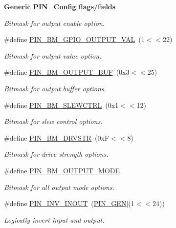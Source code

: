 \begin{Indent}{\bf Generic P\-I\-N\-\_\-\-Config flags/fields}
\begin{DoxyCompactItemize}
\begin{DoxyCompactList}\small\item\em Bitmask for output enable option. \end{DoxyCompactList}\item 
\#define \hyperlink{_p_i_n_8h_a40f78467926deed6685f0beb39594be8}{P\-I\-N\-\_\-\-B\-M\-\_\-\-G\-P\-I\-O\-\_\-\-O\-U\-T\-P\-U\-T\-\_\-\-V\-A\-L}~(1$<$$<$22)
\begin{DoxyCompactList}\small\item\em Bitmask for output value option. \end{DoxyCompactList}\item 
\#define \hyperlink{_p_i_n_8h_ae8cadb31765041c9025447cf9538e687}{P\-I\-N\-\_\-\-B\-M\-\_\-\-O\-U\-T\-P\-U\-T\-\_\-\-B\-U\-F}~(0x3$<$$<$25)
\begin{DoxyCompactList}\small\item\em Bitmask for output buffer options. \end{DoxyCompactList}\item 
\#define \hyperlink{_p_i_n_8h_ab564685f4cfb90c924db8d7993612c4b}{P\-I\-N\-\_\-\-B\-M\-\_\-\-S\-L\-E\-W\-C\-T\-R\-L}~(0x1$<$$<$12)
\begin{DoxyCompactList}\small\item\em Bitmask for slew control options. \end{DoxyCompactList}\item 
\#define \hyperlink{_p_i_n_8h_a743420ef571111b0d87f15c0aebb7834}{P\-I\-N\-\_\-\-B\-M\-\_\-\-D\-R\-V\-S\-T\-R}~(0x\-F$<$$<$8)
\begin{DoxyCompactList}\small\item\em Bitmask for drive strength options. \end{DoxyCompactList}\item 
\#define \hyperlink{_p_i_n_8h_a3ae1cb8c4750a2833e3dc0072bd9de82}{P\-I\-N\-\_\-\-B\-M\-\_\-\-O\-U\-T\-P\-U\-T\-\_\-\-M\-O\-D\-E}
\begin{DoxyCompactList}\small\item\em Bitmask for all output mode options. \end{DoxyCompactList}\item 
\#define \hyperlink{_p_i_n_8h_a4f9620411ef92f88c3d2d7ac6c576635}{P\-I\-N\-\_\-\-I\-N\-V\-\_\-\-I\-N\-O\-U\-T}~(\hyperlink{_p_i_n_8h_ae1f7e47a17caab9697e69e5b9aff270b}{P\-I\-N\-\_\-\-G\-E\-N}$|$(1$<$$<$24))
\begin{DoxyCompactList}\small\item\em Logically invert input and output. \end{DoxyCompactList}\item 
$$
\end{DoxyCompactItemize}
\end{Indent}
